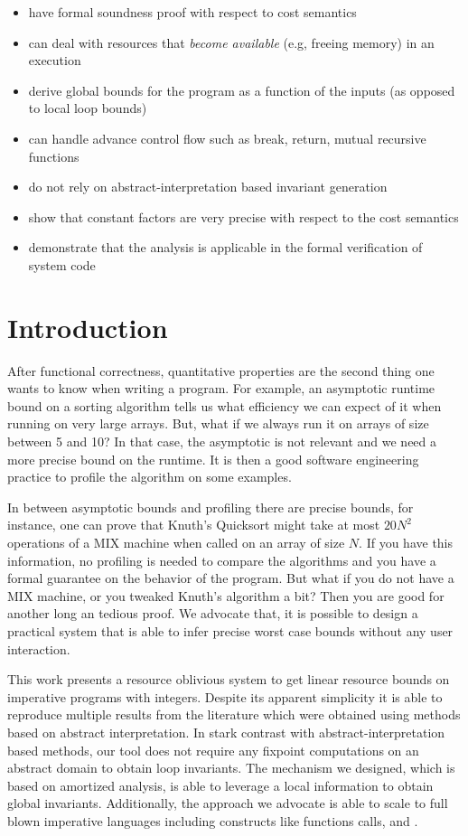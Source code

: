 \documentclass[10pt]{article}
\begin{document}
\begin{itemize}
\item have formal soundness proof with respect to cost semantics
\item can deal with resources that \emph{become available} (e.g, freeing memory) in an execution
\item derive global bounds for the program as a function of the inputs (as opposed to local loop bounds)
\item can handle advance control flow such as break, return, mutual recursive functions
\item do not rely on abstract-interpretation based invariant generation
\item show that constant factors are very precise with respect to the cost semantics
\item demonstrate that the analysis is applicable in the formal verification of system code
\end{itemize}


\section{Introduction}

After functional correctness, quantitative properties are the
second thing one wants to know when writing a program.
For example, an asymptotic runtime bound on a
sorting algorithm tells us what efficiency we can expect
of it when running on very large arrays.  But, what if we
always run it on arrays of size between 5 and 10? In that
case, the asymptotic is not relevant and we need a more
precise bound on the runtime.  It is then a good
software engineering practice to profile the algorithm on
some examples.

In between asymptotic bounds and profiling there are
precise bounds, for instance, one can prove that Knuth's Quicksort might
take at most $20N^2$ operations of a MIX machine when
called on an array of size $N$.  If you have this information,
no profiling is needed to compare the algorithms and you
have a formal guarantee on the behavior of the program. But what if you do not
have a MIX machine, or you tweaked Knuth's algorithm
a bit?  Then you are good for another long an tedious
proof.  We advocate that, it is possible to design a practical
system that is able to infer precise worst case bounds
without any user interaction.

This work presents a resource oblivious system to get
linear resource bounds on imperative programs with
integers.  Despite its apparent simplicity it is able to
reproduce multiple results from the literature which
were obtained using methods based on abstract
interpretation.  In stark contrast with abstract-interpretation
based methods, our tool does not require any
fixpoint computations on an abstract domain to obtain
loop invariants.  The mechanism we designed, which
is based on amortized analysis, is able to leverage a local
information to obtain global invariants.  Additionally, the
approach we advocate is able to scale to full blown
imperative languages including constructs like functions
calls,  and .
\end{document}
